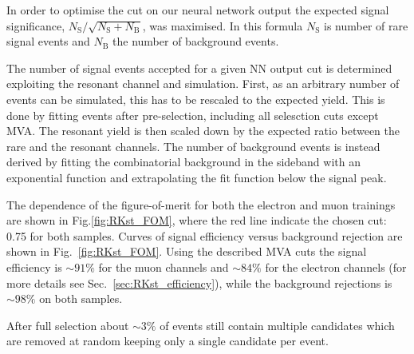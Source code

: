 In order to optimise the cut on our neural network output the expected signal significance,
$N_{\mathrm{S}}/\sqrt{N_{\mathrm{S}}+N_{\mathrm{B}}}$, was maximised.
In this formula $N_\mathrm{S}$ is number of rare signal events and $N_\mathrm{B}$ the number of background events.

The number of signal events accepted for a given NN output cut is determined exploiting the resonant channel and simulation.
First, as an arbitrary number of events can be simulated, this has to be rescaled to the expected yield.
This is done by fitting \decay{\Bz}{\Kstarz(\jpsi\to\ell^+\ell^-)} events after pre-selection,
including all selesction cuts except MVA. The resonant yield is then scaled down by the expected ratio between
the rare and the resonant channels. The number of background events is instead derived by fitting the combinatorial
background in the sideband with an exponential function and extrapolating the fit function below the signal peak.

The dependence of the figure-of-merit for both the electron and muon trainings
are shown in Fig.\ref{fig:RKst_FOM}, where the red line indicate the chosen cut: 0.75 for both samples.
Curves of signal efficiency versus background rejection are shown in Fig.~\ref{fig:RKst_FOM}.
Using the described MVA cuts the signal efficiency is $\sim 91\%$ for the muon channels
and $\sim 84\%$ for the electron channels (for more details see Sec.~\ref{sec:RKst_efficiency}),
while the background rejections is $\sim 98\%$ on both samples.

After full selection about $\sim 3\%$ of events still contain multiple candidates
which are removed at random keeping only a single candidate per event.


